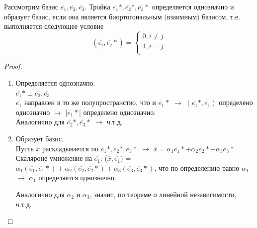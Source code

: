 \begin{theorem}
    Рассмотрим базис $\overline{e_1}, \overline{e_2}, \overline{e_3}$. Тройка $\overline{e_1}*, \overline{e_2}*, \overline{e_3}*$ определяется однозначно и образует базис, если она является $\textit{биортогональным (взаимным)}$ базисом, т.е. выполняется следующее условие
    \[
    (\overline{e_i}, \overline{e_j}*) = 
    \begin{cases}
        0, i \neq  j\\
        1, i = j\\
    \end{cases}
    \]
\end{theorem}

\begin{proof}
    \tab\\
    \begin{enumerate}
        \item Определяется однозначно.\\
            
        $\overline{e_1}* \perp \overline{e_2}, \overline{e_3}$\\
        $\overline{e_1}$ направлен в то же полупространство, что и $\overline{e_1}*$ $\longrightarrow$ $(\overline{e_1}*, \overline{e_1})$ определено однозначно $\longrightarrow$ |$\overline{e_1}*$| определено однозначно.\\
        Аналогично для $\overline{e_2}*, \overline{e_3}*$ $\longrightarrow$ ч.т.д.

        \item Образует базис.\\

        Пусть $\overline{x}$ раскладывается по $\overline{e_1}*, \overline{e_2}*, \overline{e_3}*$ $\longrightarrow$ $\overline{x} = \alpha_1\overline{e_1}* + \alpha_2\overline{e_2}* + \alpha_3\overline{e_3}*$\\
        Скаляроне умножение на $\overline{e_1}$: ($\overline{x}, \overline{e_1}$) = $\alpha_1(\overline{e_1}, \overline{e_1}*) + \alpha_2(\overline{e_2}, \overline{e_2}*) + \alpha_3(\overline{e_3}, \overline{e_3}*)$, что по определению равно $\alpha_1$ $\longrightarrow$ $\alpha_1$ определяется однозначно.

        Аналогично для $\alpha_2$ и $\alpha_3$, значит, по теореме о линейной независимости, ч.т.д.
    \end{enumerate}
\end{proof}


